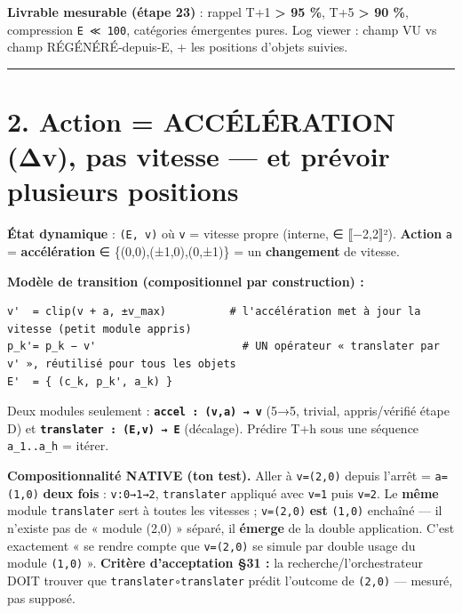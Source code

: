 \documentclass[
  french,
  11pt,
]{article}
\begin{document}
\textbf{Livrable mesurable (étape 23)} : rappel T+1
\textbf{\textgreater{} 95 \%}, T+5 \textbf{\textgreater{} 90 \%},
compression \texttt{\textbar{}E\textbar{}\ ≪\ 100}, catégories
émergentes pures. Log viewer : champ VU vs champ RÉGÉNÉRÉ‑depuis‑E, +
les positions d'objets suivies.

\begin{center}\rule{0.5\linewidth}{0.5pt}\end{center}

\section{2. Action = ACCÉLÉRATION (Δv), pas vitesse --- et prévoir
plusieurs
positions}\label{action-accuxe9luxe9ration-ux3b4v-pas-vitesse-et-pruxe9voir-plusieurs-positions}

\textbf{État dynamique} : \texttt{(E,\ v)} où \texttt{v} = vitesse
propre (interne, ∈ ⟦−2,2⟧²). \textbf{Action} \texttt{a} =
\textbf{accélération} ∈ \{(0,0),(±1,0),(0,±1)\} = un \textbf{changement}
de vitesse.

\textbf{Modèle de transition (compositionnel par construction) :}

\begin{verbatim}
v'  = clip(v + a, ±v_max)          # l'accélération met à jour la vitesse (petit module appris)
p_k'= p_k − v'                       # UN opérateur « translater par v' », réutilisé pour tous les objets
E'  = { (c_k, p_k', a_k) }
\end{verbatim}

Deux modules seulement :
\textbf{\texttt{accel\ :\ (v,a)\ →\ v\textquotesingle{}}} (5→5, trivial,
appris/vérifié étape D) et
\textbf{\texttt{translater\ :\ (E,v\textquotesingle{})\ →\ E\textquotesingle{}}}
(décalage). Prédire T+h sous une séquence \texttt{a\_1..a\_h} = itérer.

\textbf{Compositionnalité NATIVE (ton test).} Aller à \texttt{v=(2,0)}
depuis l'arrêt = \texttt{a=(1,0)} \textbf{deux fois} : \texttt{v:0→1→2},
\texttt{translater} appliqué avec \texttt{v\textquotesingle{}=1} puis
\texttt{v\textquotesingle{}=2}. Le \textbf{même} module
\texttt{translater} sert à toutes les vitesses ; \texttt{v=(2,0)}
\textbf{est} \texttt{(1,0)} enchaîné --- il n'existe pas de « module
(2,0) » séparé, il \textbf{émerge} de la double application. C'est
exactement « se rendre compte que \texttt{v=(2,0)} se simule par double
usage du module \texttt{(1,0)} ». \textbf{Critère d'acceptation §31 :}
la recherche/l'orchestrateur DOIT trouver que
\texttt{translater∘translater} prédit l'outcome de \texttt{(2,0)} ---
mesuré, pas supposé.
\end{document}
